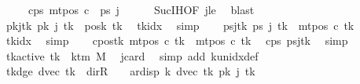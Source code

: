 \begin{isabellebody}
\ \ \ \ \ c{\isacharunderscore}{\kern0pt}ps{\isacharcolon}{\kern0pt}\ {\isachardoublequoteopen}mt{\isacharunderscore}{\kern0pt}pos\ c\ {\isacharequal}{\kern0pt}\ {\isacharquery}{\kern0pt}ps\ j{\isachardoublequoteclose}\isanewline
\ \ \ \ \isamarkupfalse%
\ Suc{\isachardot}{\kern0pt}IH{\isacharbrackleft}{\kern0pt}OF\ jle{\isacharbrackright}{\kern0pt}\ \isamarkupfalse%
\ blast\isanewline
\ \ %
\isanewline
\ \ \isamarkupfalse%
\ pkj{\isacharunderscore}{\kern0pt}tk{\isacharcolon}{\kern0pt}\ {\isachardoublequoteopen}{\isacharquery}{\kern0pt}pk\ j\ {\isacharquery}{\kern0pt}tk\ {\isacharequal}{\kern0pt}\ posk{}\ {\isacharquery}{\kern0pt}tk{\isachardoublequoteclose}\ \isamarkupfalse%
\ tkidx\ \isamarkupfalse%
\ simp\isanewline
\ \ \isamarkupfalse%
\ psj{\isacharunderscore}{\kern0pt}tk{\isacharcolon}{\kern0pt}\ {\isachardoublequoteopen}{\isacharquery}{\kern0pt}ps\ j\ {\isacharquery}{\kern0pt}tk\ {\isacharequal}{\kern0pt}\ mt{\isacharunderscore}{\kern0pt}pos\ c{}\ {\isacharquery}{\kern0pt}tk{\isachardoublequoteclose}\ \isamarkupfalse%
\ tkidx\ \isamarkupfalse%
\ simp\isanewline
\ \ \isamarkupfalse%
\ c{\isacharunderscore}{\kern0pt}pos{\isacharunderscore}{\kern0pt}tk{\isacharcolon}{\kern0pt}\ {\isachardoublequoteopen}mt{\isacharunderscore}{\kern0pt}pos\ c\ {\isacharquery}{\kern0pt}tk\ {\isacharequal}{\kern0pt}\ mt{\isacharunderscore}{\kern0pt}pos\ c{}\ {\isacharquery}{\kern0pt}tk{\isachardoublequoteclose}\ \isamarkupfalse%
\ c{\isacharunderscore}{\kern0pt}ps\ psj{\isacharunderscore}{\kern0pt}tk\ \isamarkupfalse%
\ simp\isanewline
\ \ \isamarkupfalse%
\ tk{\isacharunderscore}{\kern0pt}active{\isacharcolon}{\kern0pt}\ {\isachardoublequoteopen}{\isacharquery}{\kern0pt}tk\ {\isacharless}{\kern0pt}\ k{\isacharunderscore}{\kern0pt}tm\ M{\isachardoublequoteclose}\ \isamarkupfalse%
\ jcard\ \isamarkupfalse%
\ {\isacharparenleft}{\kern0pt}simp\ add{\isacharcolon}{\kern0pt}\ k{\isacharunderscore}{\kern0pt}unidx{\isacharunderscore}{\kern0pt}def{\isacharparenright}{\kern0pt}\isanewline
\ \ \isamarkupfalse%
\ tk{\isacharunderscore}{\kern0pt}dge{}{\isacharcolon}{\kern0pt}\ {\isachardoublequoteopen}dvec\ {\isacharquery}{\kern0pt}tk\ {\isasymnoteq}\ dir{\isachardot}{\kern0pt}R\ {\isasymLongrightarrow}\ {}\ {\isacharless}{\kern0pt}\ ar{\isacharunderscore}{\kern0pt}disp\ {\isacharquery}{\kern0pt}k\ {\isacharparenleft}{\kern0pt}dvec\ {\isacharquery}{\kern0pt}tk{\isacharparenright}{\kern0pt}\ {\isacharparenleft}{\kern0pt}{\isacharquery}{\kern0pt}pk\ j\ {\isacharquery}{\kern0pt}tk{\isacharparenright}{\kern0pt}{\isachardoublequoteclose}\isanewline

\end{isabellebody}
